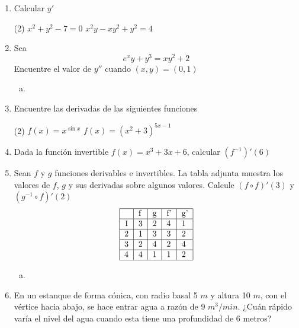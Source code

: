 \documentclass[12pt]{article}
\newenvironment{preguntas}
{\begin{enumerate}\itemsep12pt
	}
	{
	\end{enumerate}
}
\begin{document}
\begin{preguntas}
\item Calcular $y'$
\begin{tasks}(2)
\task $x^2+y^2-7=0$
\task $x^2y-xy^2+y^2=4$
\end{tasks}
\item Sea
$$e^xy+y^3 =xy^2+2$$
Encuentre el valor de $y''$ cuando $(x,y)=(0,1)$
\begin{enumerate}[a)]
\item 
\end{enumerate}
\item Encuentre las derivadas de las siguientes funciones
\begin{tasks}(2)
\task $f(x) = x^{\sin x}$
\task $f(x) = (x^2+3)^{5x-1}$
\end{tasks}
\item Dada la función invertible $f(x) = x^3 + 3x + 6$, calcular $(f^{-1})'(6)$
\item Sean $f$ y $g$ funciones derivables e invertibles. La tabla adjunta muestra los valores de $f$, $g$ y sus derivadas sobre algunos valores. Calcule $(f \circ f)'(3)$ y $(g^{-1} \circ f)'(2)$
$$
\begin{tabular}{|l|l|l|l|l|}
\hline
  & f & g & f' & g' \\ \hline
1 & 3 & 2 & 4  & 1  \\ \hline
2 & 1 & 3 & 3  & 2  \\ \hline
3 & 2 & 4 & 2  & 4  \\ \hline
4 & 4 & 1 & 1  & 2  \\ \hline
\end{tabular}
$$
\begin{enumerate}[a)]
\item 
\end{enumerate}
\item En un estanque de forma cónica, con radio basal 5 $m$ y altura 10 $m$, con el vértice hacia abajo, se hace entrar agua a razón de 9 $m^3/min$. ¿Cuán rápido varía el nivel del agua cuando esta tiene una profundidad de 6 metros?
\end{preguntas}
\end{document}

